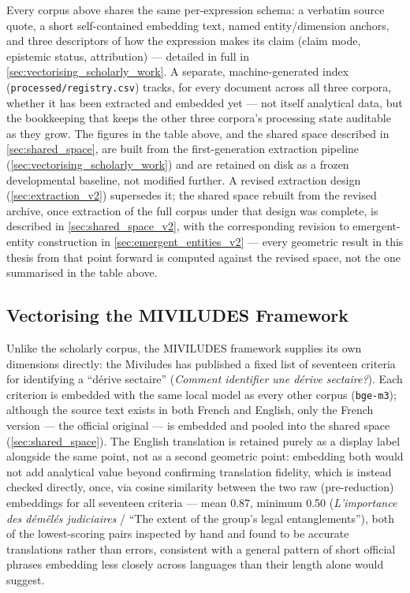 Every corpus above shares the same per-expression schema: a verbatim source quote, a short self-contained embedding text, named entity/dimension anchors, and three descriptors of how the expression makes its claim (claim mode, epistemic status, attribution) — detailed in full in \ref{sec:vectorising_scholarly_work}. A separate, machine-generated index (\texttt{processed/registry.csv}) tracks, for every document across all three corpora, whether it has been extracted and embedded yet — not itself analytical data, but the bookkeeping that keeps the other three corpora's processing state auditable as they grow. The figures in the table above, and the shared space described in \ref{sec:shared_space}, are built from the first-generation extraction pipeline (\ref{sec:vectorising_scholarly_work}) and are retained on disk as a frozen developmental baseline, not modified further. A revised extraction design (\ref{sec:extraction_v2}) supersedes it; the shared space rebuilt from the revised archive, once extraction of the full corpus under that design was complete, is described in \ref{sec:shared_space_v2}, with the corresponding revision to emergent-entity construction in \ref{sec:emergent_entities_v2} — every geometric result in this thesis from that point forward is computed against the revised space, not the one summarised in the table above.

\subsection{Vectorising the MIVILUDES Framework}\label{sec:vectorising_miviludes}
Unlike the scholarly corpus, the MIVILUDES framework supplies its own dimensions directly: the Miviludes has published a fixed list of seventeen criteria for identifying a \enquote{dérive sectaire} (\textit{Comment identifier une dérive sectaire?}). Each criterion is embedded with the same local model as every other corpus (\texttt{bge-m3}); although the source text exists in both French and English, only the French version — the official original — is embedded and pooled into the shared space (\ref{sec:shared_space}). The English translation is retained purely as a display label alongside the same point, not as a second geometric point: embedding both would not add analytical value beyond confirming translation fidelity, which is instead checked directly, once, via cosine similarity between the two raw (pre-reduction) embeddings for all seventeen criteria — mean 0.87, minimum 0.50 (\textit{L'importance des démêlés judiciaires} / \enquote{The extent of the group's legal entanglements}), both of the lowest-scoring pairs inspected by hand and found to be accurate translations rather than errors, consistent with a general pattern of short official phrases embedding less closely across languages than their length alone would suggest.

